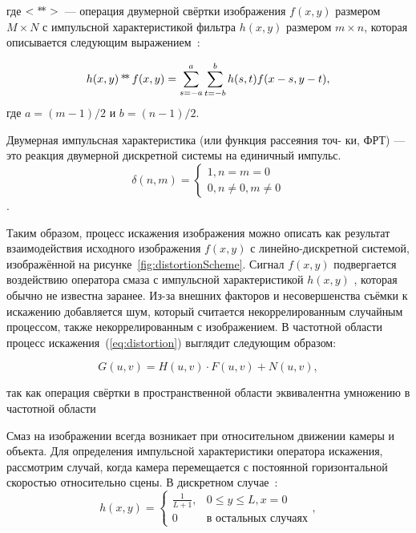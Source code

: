 где $<\operatorname*{*\!*}>$~--- операция двумерной свёртки изображения $f(x,y)$ размером $M\times N$ с импульсной характеристикой фильтра $h(x,y)$ размером $m\times n$, которая описывается следующим выражением~\cite[стр.~298]{gonsalesDigital2012}:

\begin{equation}
h(x,y) \operatorname*{*\!*} f(x,y) = \sum_{s=-a}^{a}\sum_{t=-b}^{b}h(s,t)f(x-s, y-t),
\end{equation}
где $a=(m-1)/2$ и $b = (n-1)/2$.

\begin{definition}\label{def:impulseResponse}
Двумерная импульсная характеристика (или функция рассеяния точ-
ки, ФРТ) — это реакция двумерной дискретной системы на единичный импульс.
$$\delta(n,m) = 
	\begin{cases}
		1, n=m=0\\
		0, n\ne 0, m\ne 0
	\end{cases}$$.
\end{definition}

Таким образом, процесс искажения изображения можно описать как результат взаимодействия исходного изображения $f(x, y)$ с линейно-дискретной системой, изображённой на рисунке~\ref{fig:distortionScheme}. Сигнал $f(x, y)$ подвергается воздействию оператора смаза с импульсной характеристикой $h(x, y)$ , которая обычно не известна заранее. Из-за внешних факторов и несовершенства съёмки к искажению добавляется шум, который считается некоррелированным случайным процессом, также некоррелированным с изображением.
В частотной области процесс искажения~(\ref{eq:distortion}) выглядит следующим образом:

\begin{equation}\label{eq:distortionFourier}
G(u,v) = H(u,v)\cdot F(u,v) + N(u,v),
\end{equation}

так как операция свёртки в пространственной области эквивалентна умножению в частотной области\cite[стр.~39]{basicsOfDigitalDataProcessing2016Umnyashkin}

Смаз на изображении всегда возникает при относительном движении камеры и объекта. Для определения импульсной характеристики оператора искажения, рассмотрим случай, когда камера перемещается с постоянной горизонтальной скоростью относительно сцены. В дискретном случае~\cite{iterableImageRestorationBiemonLangdeik}:
\begin{equation}\label{eq:horizontalBlurPsf}
	h(x,y) = 
		\begin{cases}
			\frac{1}{L+1}, & 0 \leq y \leq L, x=0\\
			0              & \text{в остальных случаях}
		\end{cases},
\end{equation}

